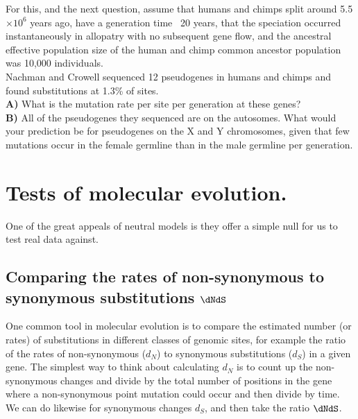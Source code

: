 



\begin{question}{}
For this, and the next question, assume that humans and chimps split
around 5.5$\times 10^6$ years ago, have a generation time ~20 years, that the speciation occurred instantaneously in allopatry with no subsequent gene flow, and the ancestral effective population size of the human and chimp common ancestor population was 10,000 individuals.\\
Nachman and Crowell sequenced 12 pseudogenes in humans and chimps and found substitutions at 1.3\% of sites. \\
{\bf A) } What is the mutation rate per site per generation at these genes?\\
{\bf B)} All of the pseudogenes they sequenced are on the autosomes. What
would your prediction be for pseudogenes on the X and Y chromosomes,
given that few mutations occur in the female
germline than in the male germline per generation.
\end{question}

\section{Tests of molecular evolution.}
One of the great appeals of neutral models is they offer a simple null
for us to test real data against. 
\subsection{Comparing the rates of non-synonymous to synonymous
substitutions $\dNdS$}
One common tool in molecular evolution is to compare the estimated
number (or rates) of substitutions in different classes of genomic
sites, for example the ratio of the rates of non-synonymous ($d_N$) to
synonymous substitutions ($d_S$) in a given gene. The simplest way to
think about calculating $d_N$ is to
count up the non-synonymous changes and divide by the total number of
positions in the gene where a non-synonymous point mutation could
occur and then divide by time. We
can do likewise for synonymous changes $d_S$, and then take the ratio $\dNdS$.

